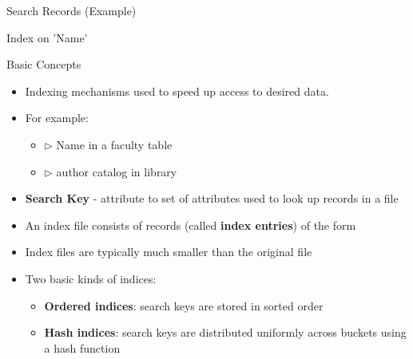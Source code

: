 \documentclass[aspectratio=169, xcolor=dvipsnames]{beamer}
\begin{document}
\begin{frame}{Search Records (Example)}
    \begin{exampleblock}{Index on 'Name'}
    \end{exampleblock}
\end{frame}

\begin{frame}{Basic Concepts}
    \begin{itemize}[<+->]
        \item Indexing mechanisms used to speed up access to desired data.
        \item For example:
        \begin{itemize}[<+->]
             \item $\triangleright$ Name in a faculty table
             \item $\triangleright$ author catalog in library
        \end{itemize}
        \item \textbf{Search Key} - attribute to set of attributes used to look up records in a file
        \item An index file consists of records (called \textbf{index entries}) of the form
        \item Index files are typically much smaller than the original file
        \item Two basic kinds of indices:
        \begin{itemize}[<+->]
            \item \textbf{Ordered indices}: search keys are stored in sorted order
            \item \textbf{Hash indices}: search keys are distributed uniformly across buckets using a hash function
        \end{itemize}
    \end{itemize}
\end{frame}
\end{document}
